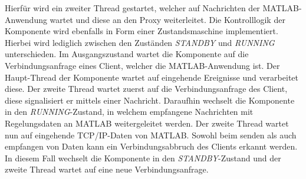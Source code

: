 Hierfür wird ein zweiter Thread gestartet, welcher auf Nachrichten der MATLAB-Anwendung wartet und diese an den Proxy weiterleitet. Die Kontrolllogik der Komponente wird ebenfalls in Form einer Zustandsmaschine implementiert. Hierbei wird lediglich zwischen den Zuständen \textit{STANDBY} und \textit{RUNNING} unterschieden. Im Ausgangszustand wartet die Komponente auf die Verbindungsanfrage eines Client, welcher die MATLAB-Anwendung ist. Der Haupt-Thread der Komponente wartet auf eingehende Ereignisse und verarbeitet diese. Der zweite Thread wartet zuerst auf die Verbindungsanfrage des Client, diese signalisiert er mittels einer Nachricht. Daraufhin wechselt die Komponente in den \textit{RUNNING}-Zustand, in welchem empfangene Nachrichten mit Regelungsdaten an MATLAB weitergeleitet werden. Der zweite Thread wartet nun auf eingehende TCP/IP-Daten von MATLAB. Sowohl beim senden als auch empfangen von Daten kann ein Verbindungsabbruch des Clients erkannt werden. In diesem Fall wechselt die Komponente in den \textit{STANDBY}-Zustand und der zweite Thread wartet auf eine neue Verbindungsanfrage.
